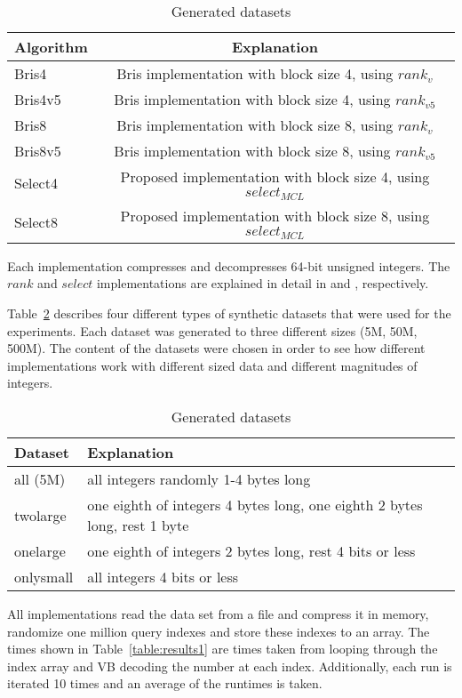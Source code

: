 \begin{table}
\centering
\caption{Generated datasets
\label{table:algorithms}}
\begin{tabular}{l|c} 
Algorithm & Explanation \\
 \hline 
  Bris4  & Bris implementation with block size 4, using $rank_v$ \\
 Bris4v5 & Bris implementation with block size 4, using $rank_{v5}$ \\
 Bris8   & Bris implementation with block size 8, using $rank_v$ \\
 Bris8v5 & Bris implementation with block size 8, using $rank_{v5}$ \\
 Select4 & Proposed implementation with block size 4, using $select_{MCL}$ \\
 Select8 & Proposed implementation with block size 8, using $select_{MCL}$ \\

\hline
\end{tabular}
\end{table}

Each implementation compresses and decompresses 64-bit unsigned integers. The $rank$ and $select$ implementations are explained in detail in  
and , respectively. 

Table~\ref{table:datasets} describes four different types of synthetic datasets that were used for the experiments. Each dataset was generated to three different sizes (5M, 50M, 500M). 
The content of the datasets were chosen in order to see how different implementations work with different sized data and different magnitudes of integers.
\begin{table}
\centering
\caption{Generated datasets
\label{table:datasets}}
\begin{tabular}{l|l} 
Dataset & Explanation \\
 \hline 
all (5M)   & all integers randomly 1-4 bytes long \\
twolarge   & one eighth of integers 4 bytes long, one eighth 2 bytes long, rest 1 byte \\
onelarge    & one eighth of integers 2 bytes long, rest 4 bits or less \\
onlysmall    & all integers 4 bits or less \\

\hline
\end{tabular}
\end{table}

All implementations read the data set from a file and compress it in memory, randomize one million query indexes and store these indexes to an array. The times shown in Table~\ref{table:results1} 
are times taken from looping through the index array and VB decoding the number at each index. Additionally, each run is iterated 10 times and an average of the runtimes is taken. 

